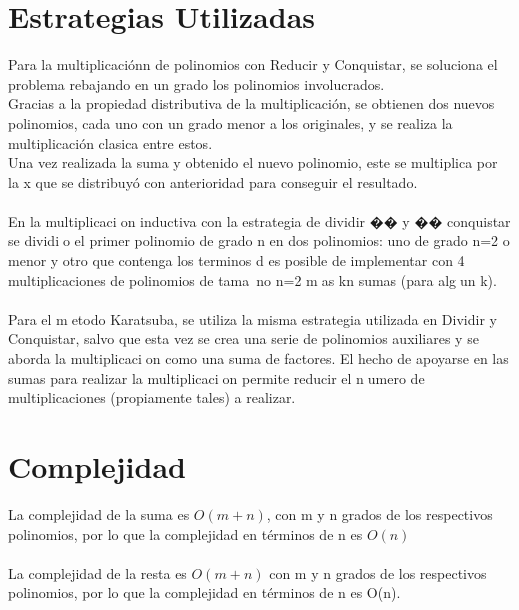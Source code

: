 \section{Estrategias Utilizadas}

Para la multiplicaciónn de polinomios con Reducir y Conquistar,
se soluciona el problema rebajando en un grado los polinomios
involucrados. \\Gracias a la propiedad distributiva de la multiplicación, se obtienen
dos nuevos polinomios, cada uno con un grado menor a los originales,
y se realiza la multiplicación clasica entre estos. \\Una vez realizada la suma y
obtenido el nuevo polinomio, este se multiplica por la x que se distribuyó con
anterioridad para conseguir el resultado.\\\\





En la multiplicacion inductiva con la estrategia de dividir �� y �� conquistar
se dividio el primer polinomio de grado n en dos polinomios: uno de grado n=2
o menor y otro que contenga los terminos d 
es posible de implementar con 4 multiplicaciones de polinomios de tama~no n=2
mas kn sumas (para algun k).\\\\


 
Para el metodo Karatsuba, se utiliza la misma estrategia utilizada en Dividir y
Conquistar, salvo que esta vez se crea una serie de polinomios auxiliares y se
aborda la multiplicacion como una suma de factores. El hecho de apoyarse en
las sumas para realizar la multiplicacion permite reducir el numero de multiplicaciones
(propiamente tales) a realizar.

\newpage
\section{Complejidad}

La complejidad de la suma es $O(m + n)$, con m y n grados de los respectivos polinomios, por lo que la complejidad en términos de n es $O(n)$\\\\

La complejidad de la resta es $O(m+n)$ con m y n grados de los respectivos polinomios, por lo que la complejidad en términos de n es O(n).\\\\

